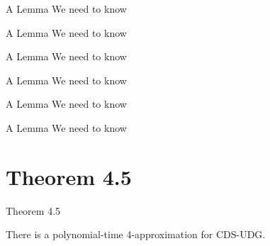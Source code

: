 \documentclass{beamer}
\begin{document}
\begin{frame}{}



\end{frame}

\begin{frame}{A Lemma We need to know}



\end{frame}

\begin{frame}{A Lemma We need to know}



\end{frame}

\begin{frame}{A Lemma We need to know}



\end{frame}

\begin{frame}{A Lemma We need to know}



\end{frame}

\begin{frame}{A Lemma We need to know}



\end{frame}

\begin{frame}{A Lemma We need to know}



\end{frame}

\section{Theorem 4.5}

\begin{frame}



\begin{block}{Theorem 4.5}

    There is a polynomial-time 4-approximation for CDS-UDG.

\end{block}

\end{frame}
\end{document}
